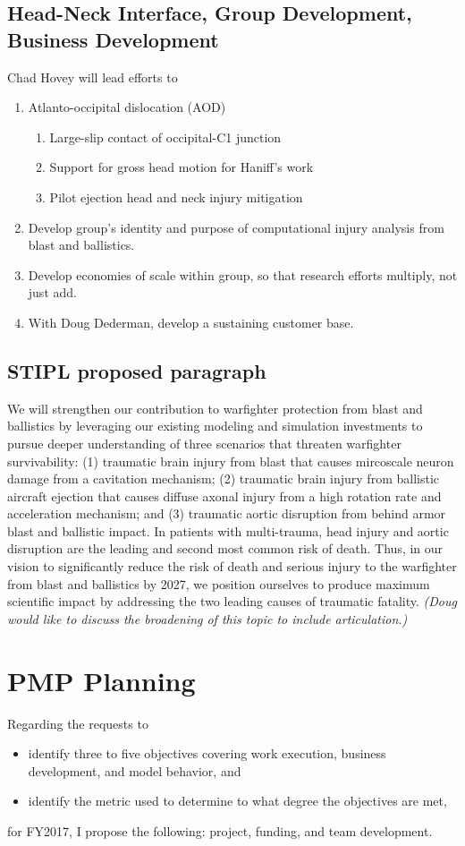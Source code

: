 \documentclass[12pt,reqno]{amsart}
\begin{document}
\subsection{Head-Neck Interface, Group Development, Business Development}
Chad Hovey will lead efforts to
\begin{enumerate}
	\item Atlanto-occipital dislocation (AOD) 
	\begin{enumerate}
		\item Large-slip contact of occipital-C1 junction
		\item Support for gross head motion for Haniff's work
		\item Pilot ejection head and neck injury mitigation
	\end{enumerate}
	\item Develop group's identity and purpose of 
	computational injury analysis from blast and ballistics.
	\item Develop economies of scale within group, so that 
	research efforts multiply, not just add.
	\item With Doug Dederman, develop a sustaining customer base.
\end{enumerate}


\subsection{STIPL proposed paragraph}
We will strengthen our contribution to warfighter protection from
blast and ballistics by leveraging our existing modeling and simulation
investments to pursue deeper understanding of three scenarios that
threaten warfighter survivability: (1) traumatic brain injury from blast
that causes mircoscale neuron damage from a cavitation mechanism;
(2) traumatic brain injury from ballistic aircraft ejection that causes
diffuse axonal injury from a high rotation rate and acceleration mechanism;
and (3) traumatic aortic disruption from behind armor blast and 
ballistic impact.  In patients with multi-trauma, head injury and aortic
disruption are the leading and second most common risk of death.  
Thus, in our vision to significantly reduce the risk of death and serious
injury to the warfighter from blast and ballistics by 2027, we position
ourselves to produce maximum scientific impact by addressing the two
leading causes of traumatic fatality.
{\em
(Doug would like to discuss the broadening of this topic to include
articulation.)
}


\section{PMP Planning}
Regarding the requests to
\begin{itemize}
\item identify three to five objectives covering work execution, business
development, and model behavior, and
\item identify the metric used to determine to what degree the objectives are
met,
\end{itemize}
for FY2017, I propose the following: project, funding, and team development.
\end{document}
